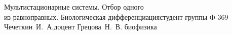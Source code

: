 



\usepackage{color}
\usepackage[colorlinks,linkcolor=black,filecolor=blue,citecolor=darkgreen]{hyperref}

\renewcommand{\labelitemi}{\normalfont\bfseries{--}}
\newcommand{\st}[1]{\bar{#1}}
\newcommand{\ds}{\displaystyle}


{Мультистационарные системы. Отбор одного\\из равноправных. Биологическая
дифференциация}{студент группы Ф-369 Чечеткин~И.~А.}{доцент Грецова~Н.~В.}
{биофизика}
        
    \tableofcontents
    \thispagestyle{empty}
    \newpage
    
